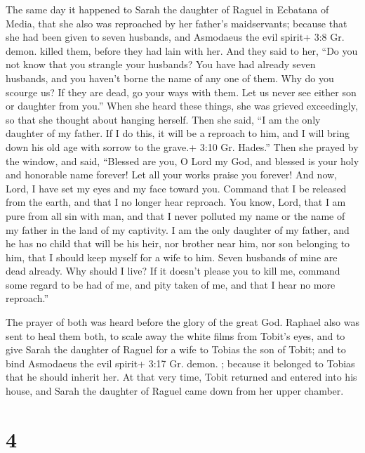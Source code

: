  The same day it happened to Sarah the daughter of Raguel in
Ecbatana of Media, that she also was reproached by her father's
maidservants;  because that she had been given to seven
husbands, and Asmodaeus the evil spirit+ 3:8 Gr. demon. killed them,
before they had lain with her. And they said to her, ``Do you not know
that you strangle your husbands? You have had already seven husbands,
and you haven't borne the name of any one of them.  Why do
you scourge us? If they are dead, go your ways with them. Let us never
see either son or daughter from you.''  When she heard
these things, she was grieved exceedingly, so that she thought about
hanging herself. Then she said, ``I am the only daughter of my father.
If I do this, it will be a reproach to him, and I will bring down his
old age with sorrow to the grave.+ 3:10 Gr. Hades.''  Then
she prayed by the window, and said, ``Blessed are you, O Lord my God,
and blessed is your holy and honorable name forever! Let all your works
praise you forever!  And now, Lord, I have set my eyes and
my face toward you.  Command that I be released from the
earth, and that I no longer hear reproach.  You know, Lord,
that I am pure from all sin with man,  and that I never
polluted my name or the name of my father in the land of my captivity. I
am the only daughter of my father, and he has no child that will be his
heir, nor brother near him, nor son belonging to him, that I should keep
myself for a wife to him. Seven husbands of mine are dead already. Why
should I live? If it doesn't please you to kill me, command some regard
to be had of me, and pity taken of me, and that I hear no more
reproach.''

 The prayer of both was heard before the glory of the great
God.  Raphael also was sent to heal them both, to scale
away the white films from Tobit's eyes, and to give Sarah the daughter
of Raguel for a wife to Tobias the son of Tobit; and to bind Asmodaeus
the evil spirit+ 3:17 Gr. demon. ; because it belonged to Tobias that he
should inherit her. At that very time, Tobit returned and entered into
his house, and Sarah the daughter of Raguel came down from her upper
chamber.

\hypertarget{section-3}{%
\section{4}\label{section-3}}

